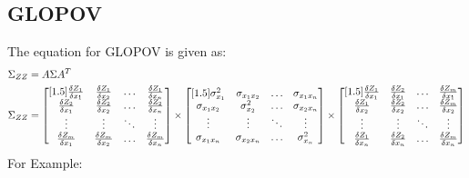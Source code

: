 \subsection{GLOPOV}
The equation for GLOPOV is given as:
\begin{align*}
\Sigma_{ZZ} &= 
A\Sigma A^T \\
\Sigma_{ZZ} &= 
\begin{bmatrix}[1.5]
\frac{\delta Z_1}{\delta x_1} & \frac{\delta Z_1}{\delta x_2} & \hdots & \frac{\delta Z_1}{\delta x_n} \\
\frac{\delta Z_2}{\delta x_1} & \frac{\delta Z_2}{\delta x_2} & \hdots & \frac{\delta Z_2}{\delta x_n} \\
\vdots & \vdots & \ddots & \vdots \\
\frac{\delta Z_m}{\delta x_1} & \frac{\delta Z_m}{\delta x_2} & \hdots & \frac{\delta Z_m}{\delta x_n} \\
\end{bmatrix}
\times
\begin{bmatrix}[1.5]
\sigma^2_{x_{1}} & \sigma_{x_{1}x_{2}} & \hdots & \sigma_{x_{1}x_{n}} \\
\sigma_{x_{1}x_{2}} & \sigma^2_{x_{2}} & \hdots & \sigma_{x_{2}x_{n}} \\
\vdots & \vdots & \ddots & \vdots \\
\sigma_{x_{1}x_{n}} & \sigma_{x_{2}x_{n}} & \hdots & \sigma^2_{x_{n}} \\
\end{bmatrix}
\times
\begin{bmatrix}[1.5]
\frac{\delta Z_1}{\delta x_1} & \frac{\delta Z_2}{\delta x_1} & \hdots & \frac{\delta Z_m}{\delta x_1} \\
\frac{\delta Z_1}{\delta x_2} & \frac{\delta Z_2}{\delta x_2} & \hdots & \frac{\delta Z_m}{\delta x_2} \\
\vdots & \vdots & \ddots & \vdots \\
\frac{\delta Z_1}{\delta x_n} & \frac{\delta Z_2}{\delta x_n} & \hdots & \frac{\delta Z_m}{\delta x_n} \\
\end{bmatrix}
\end{align*}
For Example:


